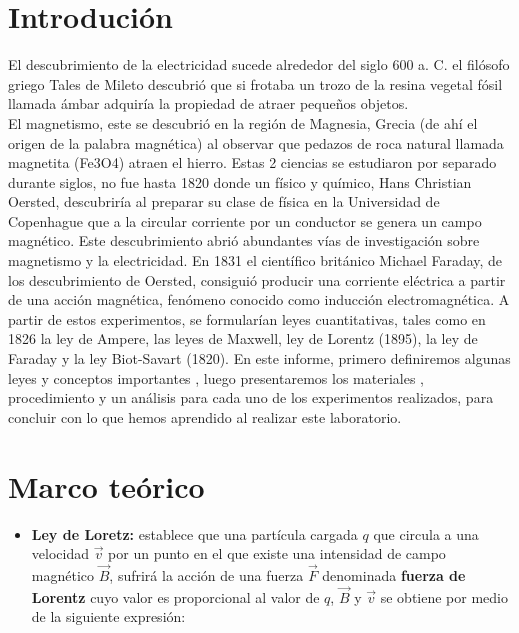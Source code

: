 \documentclass[]{article}
\begin{document}
\begin{multicols*}{2}

\section*{Introdución}
El descubrimiento de la electricidad sucede alrededor del siglo 600 a. C. el filósofo griego Tales de Mileto descubrió que si frotaba un trozo de la resina vegetal fósil llamada ámbar adquiría la propiedad de atraer pequeños objetos.\\
 El magnetismo, este se descubrió en la región de Magnesia, Grecia (de ahí el origen de la palabra magnética) al observar que pedazos de roca natural llamada magnetita (Fe3O4) atraen el hierro.
Estas 2 ciencias se estudiaron por separado durante siglos, no fue hasta 1820 donde un físico y químico, Hans Christian Oersted, descubriría al preparar su clase de física en la Universidad de Copenhague que a la circular corriente por un conductor se genera un campo magnético.
Este descubrimiento abrió abundantes vías de investigación sobre magnetismo y la electricidad.  
En 1831 el científico británico Michael Faraday, de los descubrimiento de Oersted, consiguió producir una corriente eléctrica a partir de una acción magnética, fenómeno conocido como inducción electromagnética.
 A partir de estos experimentos, se formularían leyes cuantitativas, tales como en 1826 la ley de Ampere, las leyes de Maxwell, ley de Lorentz (1895), la ley de Faraday y la ley Biot-Savart (1820).
 En este informe, primero definiremos algunas leyes y conceptos importantes , luego presentaremos los materiales , procedimiento y un análisis para cada uno de los experimentos realizados, para concluir con lo que hemos aprendido al realizar este laboratorio.


\section*{Marco teórico}
\begin{itemize}
    \item \textbf{Ley de Loretz: }\cite{Ley-de-Lorentz}  establece que una partícula cargada $q$ que circula a una velocidad $\overrightarrow{v}$ por un punto en el que existe una 
    intensidad de campo magnético $\overrightarrow{B}$, sufrirá la acción de una fuerza $\overrightarrow{F}$ denominada \textbf{fuerza de Lorentz} cuyo valor
    es proporcional al valor de $q$, $\overrightarrow{B}$ y $\overrightarrow{v}$ se obtiene por medio de la siguiente expresión:
    

\end{itemize}
\end{multicols*}
\end{document}
